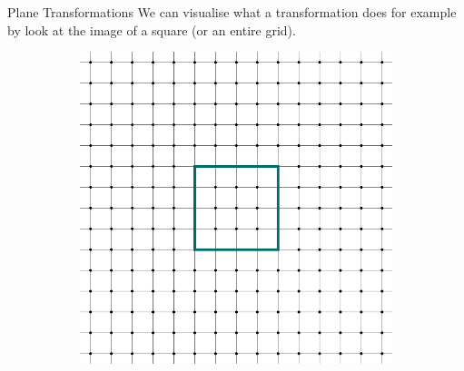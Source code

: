 \documentclass[final]{beamer}
\newlength{\colwidth}
\begin{document}
\begin{frame}[t]
\begin{columns}[t]
\begin{column}{\colwidth}
\begin{block}{Plane Transformations}
  We can visualise what a transformation does for example by look at the image
  of a square (or an entire grid).
  \begin{figure}[H]
   \centering
   \begin{subfigure}[c]{.2\textwidth}
    \centering
    \includegraphics[width=\textwidth]{grid.png}
   \end{subfigure}
   \begin{subfigure}[c]{.1\textwidth}
    \centering
   \end{subfigure}
   \begin{subfigure}[c]{.2\textwidth}
    \centering

\end{subfigure}
\end{figure}
\end{block}
\end{column}
\end{columns}
\end{frame}
\end{document}
